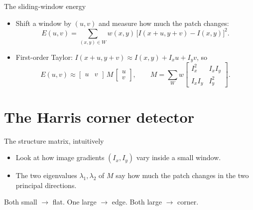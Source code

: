 \documentclass[10pt,aspectratio=169]{beamer}
\begin{document}
\begin{frame}{The sliding-window energy}
  \begin{itemize}
    \item Shift a window by $(u,v)$ and measure how much the patch changes:
    \[ E(u,v)=\sum_{(x,y)\in W} w(x,y)\,\big[I(x+u,y+v)-I(x,y)\big]^2 . \]
    \item First-order Taylor: $I(x+u,y+v)\approx I(x,y)+I_x u + I_y v$, so
    \[ E(u,v)\approx \begin{bmatrix} u & v \end{bmatrix} \, M \, \begin{bmatrix} u \\ v \end{bmatrix},
       \qquad M=\sum_W w\begin{bmatrix} I_x^2 & I_xI_y \\ I_xI_y & I_y^2 \end{bmatrix}. \]
  \end{itemize}
\end{frame}

\section{The Harris corner detector}

\begin{frame}{The structure matrix, intuitively}
  \begin{itemize}
    \item Look at how image gradients $(I_x, I_y)$ vary inside a small window.
    \item The two eigenvalues $\lambda_1,\lambda_2$ of $M$ say how much the patch changes in the two
          principal directions.
  \end{itemize}
  \begin{center}
  \end{center}
  \begin{mathbox}
    Both small $\rightarrow$ flat. One large $\rightarrow$ edge. \alert{Both large $\rightarrow$ corner.}
  \end{mathbox}
\end{frame}
\end{document}
